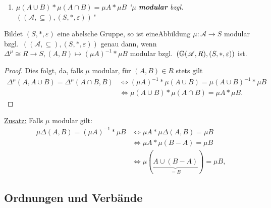 \begin{beispiel}
\begin{enumerate}
        \item $\mu(A \cup B) \ast \mu(A \cap B) = \mu A \ast \mu B$ \textit{"$\mu$ \textbf{modular} bzgl. $((\mathscr{A},\subseteq),(S,\ast,\varepsilon))$"}
    \end{enumerate}
    \begin{proposition}
        \label{prop:FunktAbelschModular}
        Bildet $(S,\ast,\varepsilon)$ eine abelsche Gruppe, so ist eineAbbildung $\mu\colon\mathscr{A} \to S$ modular bzgl.~$((\mathscr{A},\subseteq),(S,\ast,\varepsilon))$ genau dann,
        wenn $\Delta^\mu\cong R \to S, (A,B) \mapsto (\mu A)^{-1}\ast \mu B$ modular bzgl.~$(\mathbb{G}(\mathscr{A},R),(S,\ast,\varepsilon))$ ist.
        \begin{proof}
            Dies folgt, da, falls $\mu$ modular, für $(A,B) \in R$ stets gilt
            \begin{align*}
                \Delta^\mu(A, A \cup B) = \Delta^\mu(A \cap B, B) & \iff (\mu A)^{-1} \ast \mu(A \cup B) = \mu(A \cup B)^{-1} \ast \mu B\\
                & \iff \mu(A \cup B) \ast \mu(A\cap B) = \mu A \ast \mu B.
            \end{align*}
        \end{proof}
    \end{proposition}
    \underline{Zusatz:} Falls $\mu$ modular gilt:
    \begin{align*}
        \mu\Delta(A,B) =(\mu A)^{-1}\ast \mu B &\iff \mu A \ast \mu\Delta(A,B) = \mu B\\
        & \iff \mu A \ast \mu (B-A) = \mu B\\
        & \iff \mu ( \underbrace{A \cup (B-A)}_{=B})= \mu B,
    \end{align*}
\end{beispiel}

\subsection{Ordnungen und Verbände}


